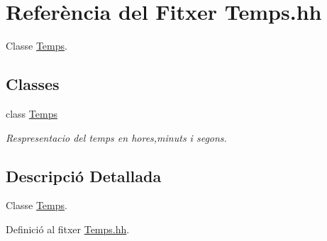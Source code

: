\hypertarget{_temps_8hh}{\section{Referència del Fitxer Temps.\-hh}
\label{_temps_8hh}
}


Classe \hyperlink{class_temps}{Temps}.  


\subsection*{Classes}
\begin{DoxyCompactItemize}
\item 
class \hyperlink{class_temps}{Temps}
\begin{DoxyCompactList}\small\item\em Respresentacio del temps en hores,minuts i segons. \end{DoxyCompactList}\end{DoxyCompactItemize}


\subsection{Descripció Detallada}
Classe \hyperlink{class_temps}{Temps}. 

Definició al fitxer \hyperlink{_temps_8hh_source}{Temps.\-hh}.

